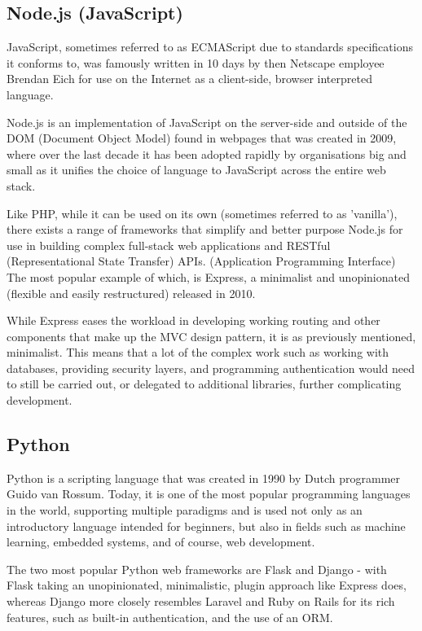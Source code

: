 \subsection{Node.js (JavaScript)}
JavaScript, sometimes referred to as ECMAScript due to standards specifications it conforms to,\cite{Mozilla1} was famously written in 10 days by then Netscape employee Brendan Eich for use on the Internet as a client-side, browser interpreted language. \cite{Buytaert1} 

Node.js is an implementation of JavaScript on the server-side and outside of the DOM (Document Object Model) found in webpages that was created in 2009, where over the last decade it has been adopted rapidly by organisations big and small as it unifies the choice of language to JavaScript across the entire web stack. \cite{Copes1}

Like PHP, while it can be used on its own (sometimes referred to as 'vanilla'), there exists a range of frameworks that simplify and better purpose Node.js for use in building complex full-stack web applications and RESTful (Representational State Transfer) APIs. (Application Programming Interface) The most popular example of which, is Express, a minimalist and unopinionated (flexible and easily restructured) released in 2010. \cite{Mozilla2}

While Express eases the workload in developing working routing and other components that make up the MVC design pattern, it is as previously mentioned, minimalist. This means that a lot of the complex work such as working with databases, providing security layers, and programming authentication would need to still be carried out, or delegated to additional libraries, further complicating development.

\subsection{Python}
Python is a scripting language that was created in 1990 by Dutch programmer Guido van Rossum. \cite{Python1} Today, it is one of the most popular programming languages in the world, supporting multiple paradigms and is used not only as an introductory language intended for beginners, but also in fields such as machine learning, embedded systems, and of course, web development. \cite{Heath1}

The two most popular Python web frameworks are Flask and Django - with Flask taking an unopinionated, minimalistic, plugin approach like Express does, whereas Django more closely resembles Laravel and Ruby on Rails for its rich features, such as built-in authentication, and the use of an ORM. 

